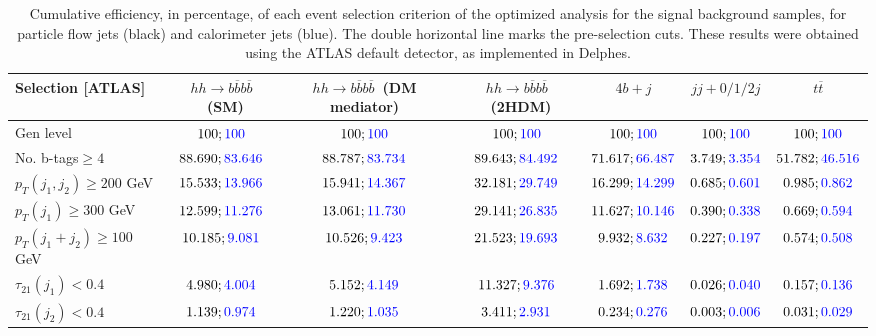\begin{landscape}
	\begin{table}
		\centering
		\caption{Cumulative efficiency, in percentage, of each event selection criterion of the optimized analysis for the signal background samples, for particle flow jets (black) and calorimeter jets (blue). The double horizontal line marks the pre-selection cuts. These results were obtained using the ATLAS default detector, as implemented in Delphes.}
		\begin{tabular}{lcccccc}
			\toprule 
			\textbf{Selection [ATLAS]} & $hh\rightarrow b\overline{b}b\overline{b}$~(SM) & $hh\rightarrow b\overline{b}b\overline{b}$~(DM mediator) & $hh\rightarrow b\overline{b}b\overline{b}$~(2HDM) & $4b+j$  & $jj+0/1/2 j$ & $t\overline{t}$ \\
			\midrule
			Gen level & $100;\textcolor{blue}{100}$ & $100;\textcolor{blue}{100}$ &$100;\textcolor{blue}{100}$& $100;\textcolor{blue}{100}$& $100;\textcolor{blue}{100}$& $100;\textcolor{blue}{100}$ \\
			\rowcolor{black!7}No. b-tags$\geq 4$&$88.690;\textcolor{blue}{83.646}$&$88.787;\textcolor{blue}{83.734}$&$89.643;\textcolor{blue}{84.492}$&$71.617;\textcolor{blue}{66.487}$&$3.749;\textcolor{blue}{3.354}$&$51.782;\textcolor{blue}{46.516}$\\
			$p_T(j_1,j_2)\geq200$ GeV & $15.533;\textcolor{blue}{13.966}$ & $15.941;\textcolor{blue}{14.367}$&$32.181;\textcolor{blue}{29.749}$ &$16.299;\textcolor{blue}{14.299}$&$0.685;\textcolor{blue}{0.601}$&$0.985;\textcolor{blue}{0.862}$\\ 
			\midrule \midrule
			\rowcolor{black!7}$p_T(j_1)\geq 300$ GeV & $12.599;\textcolor{blue}{11.276}$ &$13.061;\textcolor{blue}{11.730}$  &$29.141;\textcolor{blue}{26.835}$&$11.627;\textcolor{blue}{10.146}$&$0.390;\textcolor{blue}{0.338}$&$0.669;\textcolor{blue}{0.594}$\\ 
			$p_T(j_1+j_2)\geq 100$ GeV &$10.185;\textcolor{blue}{9.081}$ & $10.526;\textcolor{blue}{9.423}$ &$21.523;\textcolor{blue}{19.693}$&$9.932;\textcolor{blue}{8.632}$&$0.227;\textcolor{blue}{0.197}$&$0.574;\textcolor{blue}{0.508}$\\
			\rowcolor{black!7}$\tau_{21}(j_1)<0.4$ & $4.980;\textcolor{blue}{4.004}$& $5.152;\textcolor{blue}{4.149}$&$11.327;\textcolor{blue}{9.376}$&$1.692;\textcolor{blue}{1.738}$&$0.026;\textcolor{blue}{0.040}$&$0.157;\textcolor{blue}{0.136}$\\
			$\tau_{21}(j_2)<0.4$ &$1.139;\textcolor{blue}{0.974}$ &$1.220;\textcolor{blue}{1.035}$ &$3.411;\textcolor{blue}{2.931}$&$0.234;\textcolor{blue}{0.276}$&$0.003;\textcolor{blue}{0.006}$&$0.031;\textcolor{blue}{0.029}$\\

\end{tabular}
\end{table}
\end{landscape}
